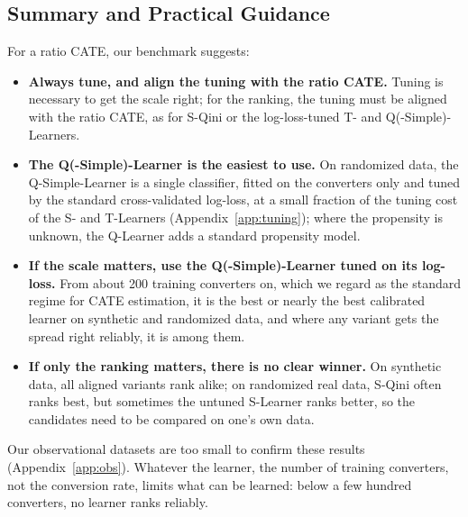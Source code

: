 \documentclass{article}
\begin{document}
\subsection{Summary and Practical Guidance}
\label{sec:joint-v2}
\label{sec:guidance-v2}
For a ratio CATE, our benchmark suggests:
\begin{itemize}
  \item \textbf{Always tune, and align the tuning with the ratio CATE.}
  Tuning is necessary to get the scale right; for the ranking, the tuning
  must be aligned with the ratio CATE, as for S-Qini or the log-loss-tuned
  T- and Q(-Simple)-Learners.
  \item \textbf{The Q(-Simple)-Learner is the easiest to use.} On randomized
  data, the Q-Simple-Learner is a single classifier, fitted on the converters
  only and tuned by the standard cross-validated log-loss, at a small
  fraction of the tuning cost of the S- and T-Learners
  (Appendix~\ref{app:tuning}); where the propensity is unknown, the Q-Learner adds a standard propensity model.
  \item \textbf{If the scale matters, use the Q(-Simple)-Learner tuned on its
  log-loss.} From about 200 training converters on, which we regard as the
  standard regime for CATE estimation, it is the best or nearly the best
  calibrated learner on synthetic and randomized data, and where any variant
  gets the spread right reliably, it is among them.
  \item \textbf{If only the ranking matters, there is no clear winner.} On
  synthetic data, all aligned variants rank alike; on randomized real data,
  S-Qini often ranks best, but sometimes the untuned S-Learner ranks better,
  so the candidates need to be compared on one's own data.
\end{itemize}
Our observational datasets are too small to confirm these results
(Appendix~\ref{app:obs}). Whatever the learner, the number of training
converters, not the conversion rate, limits what can be learned: below a few
hundred converters, no learner ranks reliably.
\end{document}
